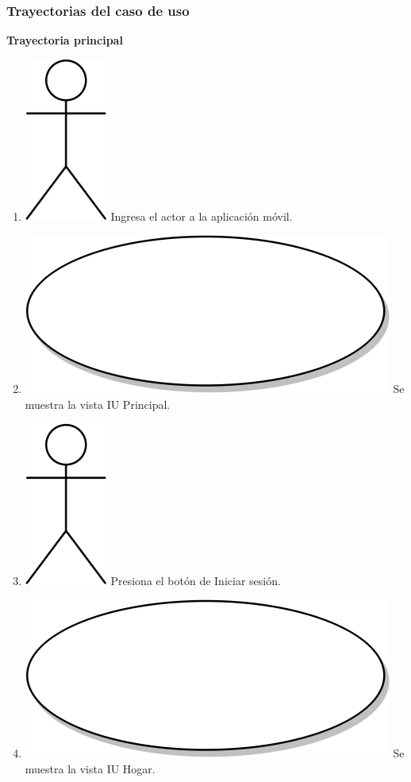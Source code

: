\subsubsection{Trayectorias del caso de uso}
\textbf{Trayectoria principal}
\begin{enumerate}
   \item {\includegraphics[scale=.1]{Capitulo3/img/actor.png} Ingresa el actor a la aplicación móvil.}
\item {\includegraphics[scale=.05]{Capitulo3/img/proceso.png} Se muestra la vista IU Principal.}
\item {\includegraphics[scale=.1]{Capitulo3/img/actor.png} Presiona el botón de Iniciar sesión.}
\item {\includegraphics[scale=.05]{Capitulo3/img/proceso.png} Se muestra la vista IU Hogar.}

\end{enumerate}
